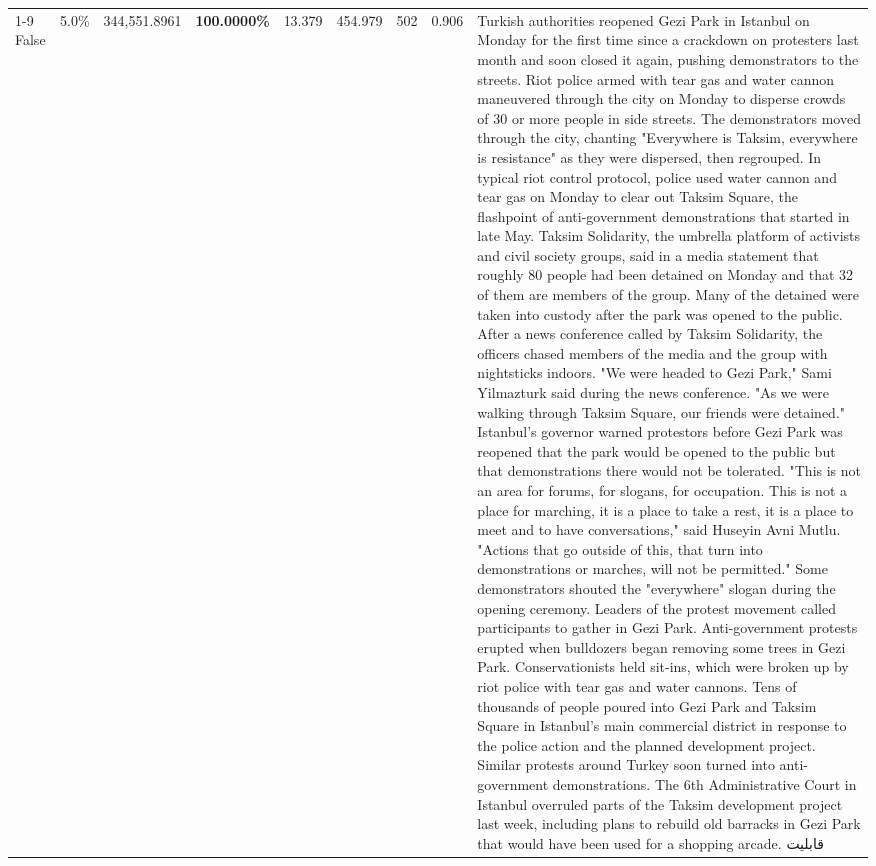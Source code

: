 \begin{table}[H]
\begin{tabular}{lllrlllll}
\cline{1-9}
False & 5.0\% & 344,551.8961 & \bfseries \color{red} 100.0000\% & 13.379 & 454.979 & 502 & 0.906 & Turkish authorities reopened Gezi Park in Istanbul on Monday for the first time since a crackdown on protesters last month and soon closed it again, pushing demonstrators to the streets. Riot police armed with tear gas and water cannon maneuvered through the city on Monday to disperse crowds of 30 or more people in side streets. The demonstrators moved through the city, chanting "Everywhere is Taksim, everywhere is resistance" as they were dispersed, then regrouped. In typical riot control protocol, police used water cannon and tear gas on Monday to clear out Taksim Square, the flashpoint of anti-government demonstrations that started in late May. Taksim Solidarity, the umbrella platform of activists and civil society groups, said in a media statement that roughly 80 people had been detained on Monday and that 32 of them are members of the group. Many of the detained were taken into custody after the park was opened to the public. After a news conference called by Taksim Solidarity, the officers chased members of the media and the group with nightsticks indoors. "We were headed to Gezi Park," Sami Yilmazturk said during the news conference. "As we were walking through Taksim Square, our friends were detained." Istanbul's governor warned protestors before Gezi Park was reopened that the park would be opened to the public but that demonstrations there would not be tolerated. "This is not an area for forums, for slogans, for occupation. This is not a place for marching, it is a place to take a rest, it is a place to meet and to have conversations," said Huseyin Avni Mutlu. "Actions that go outside of this, that turn into demonstrations or marches, will not be permitted." Some demonstrators shouted the "everywhere" slogan during the opening ceremony. Leaders of the protest movement called participants to gather in Gezi Park. Anti-government protests erupted when bulldozers began removing some trees in Gezi Park. Conservationists held sit-ins, which were broken up by riot police with tear gas and water cannons. Tens of thousands of people poured into Gezi Park and Taksim Square in Istanbul's main commercial district in response to the police action and the planned development project. Similar protests around Turkey soon turned into anti-government demonstrations. The 6th Administrative Court in Istanbul overruled parts of the Taksim development project last week, including plans to rebuild old barracks in Gezi Park that would have been used for a shopping arcade. قابلیت \\

\end{tabular}
\end{table}
